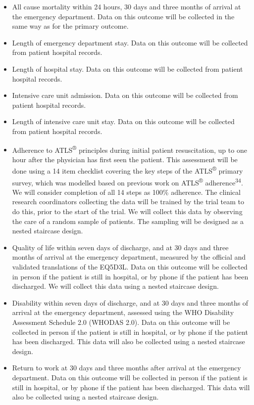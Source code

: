 \documentclass[
]{scrartcl}
\providecommand{\tightlist}{%
  \setlength{\itemsep}{0pt}\setlength{\parskip}{0pt}}\usepackage{longtable,booktabs,array}
\begin{document}
\begin{itemize}
\tightlist
\item
  All cause mortality within 24 hours, 30 days and three months of
  arrival at the emergency department. Data on this outcome will be
  collected in the same way as for the primary outcome.
\item
  Length of emergency department stay. Data on this outcome will be
  collected from patient hospital records.
\item
  Length of hospital stay. Data on this outcome will be collected from
  patient hospital records.
\item
  Intensive care unit admission. Data on this outcome will be collected
  from patient hospital records.
\item
  Length of intensive care unit stay. Data on this outcome will be
  collected from patient hospital records.
\item
  Adherence to ATLS\textsuperscript{®} principles during initial patient
  resuscitation, up to one hour after the physician has first seen the
  patient. This assessment will be done using a 14 item checklist
  covering the key steps of the ATLS\textsuperscript{®} primary survey,
  which was modelled based on previous work on ATLS\textsuperscript{®}
  adherence\textsuperscript{34}. We will consider completion of all 14
  steps as 100\% adherence. The clinical research coordinators
  collecting the data will be trained by the trial team to do this,
  prior to the start of the trial. We will collect this data by
  observing the care of a random sample of patients. The sampling will
  be designed as a nested staircase design.
\item
  Quality of life within seven days of discharge, and at 30 days and
  three months of arrival at the emergency department, measured by the
  official and validated translations of the EQ5D3L. Data on this
  outcome will be collected in person if the patient is still in
  hospital, or by phone if the patient has been discharged. We will
  collect this data using a nested staircase design.
\item
  Disability within seven days of discharge, and at 30 days and three
  months of arrival at the emergency department, assessed using the WHO
  Disability Assessment Schedule 2.0 (WHODAS 2.0). Data on this outcome
  will be collected in person if the patient is still in hospital, or by
  phone if the patient has been discharged. This data will also be
  collected using a nested staircase design.
\item
  Return to work at 30 days and three months after arrival at the
  emergency department. Data on this outcome will be collected in person
  if the patient is still in hospital, or by phone if the patient has
  been discharged. This data will also be collected using a nested
  staircase design.
\end{itemize}
\end{document}
